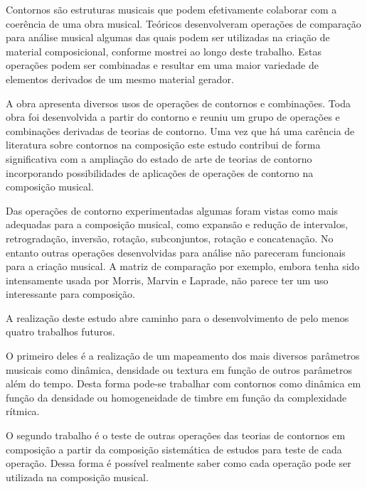 Contornos são estruturas musicais que podem efetivamente colaborar com
a coerência de uma obra musical. Teóricos desenvolveram operações de
comparação para análise musical algumas das quais podem ser utilizadas
na criação de material composicional, conforme mostrei ao longo deste
trabalho. Estas operações podem ser combinadas e resultar em uma maior
variedade de elementos derivados de um mesmo material gerador.

A obra \obra{} apresenta diversos usos de operações de contornos e
combinações. Toda obra foi desenvolvida a partir do contorno \contpr{}
e reuniu um grupo de operações e combinações derivadas de teorias de
contorno. Uma vez que há uma carência de literatura sobre contornos na
composição este estudo contribui de forma significativa com a
ampliação do estado de arte de teorias de contorno incorporando
possibilidades de aplicações de operações de contorno na composição
musical.


Das operações de contorno experimentadas algumas foram vistas como
mais adequadas para a composição musical, como expansão e redução de
intervalos, retrogradação, inversão, rotação, subconjuntos, rotação e
concatenação. No entanto outras operações desenvolvidas para análise
não pareceram funcionais para a criação musical. A matriz de
comparação por exemplo, embora tenha sido intensamente usada por
Morris, Marvin e Laprade, não parece ter um uso interessante para
composição.

A realização deste estudo abre caminho para o desenvolvimento de pelo
menos quatro trabalhos futuros.


O primeiro deles é a realização de um mapeamento dos mais diversos
parâmetros musicais como dinâmica, densidade ou textura em função de
outros parâmetros além do tempo. Desta forma pode-se trabalhar com
contornos como dinâmica em função da densidade ou homogeneidade de
timbre em função da complexidade rítmica.


O segundo trabalho é o teste de outras operações das teorias de
contornos em composição a partir da composição sistemática de estudos
para teste de cada operação. Dessa forma é possível realmente saber
como cada operação pode ser utilizada na composição musical.

